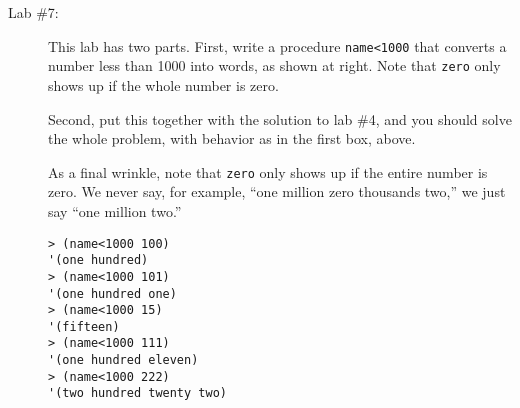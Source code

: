 \documentclass{article}
\begin{document}
\begin{description}
\item[Lab \#7:]  
\begin{multicols}{2} This lab has two parts.
First, write a procedure {\tt name<1000} that converts a
  number less than 1000 into words, as shown at right.
Note that {\tt zero} only shows up if the whole number is zero. 

Second, put this together with the solution to lab \#4, and you should
solve the whole problem, with behavior as in the first box, above.

As a final wrinkle, note that {\tt zero} only shows up if the entire
number is zero.  We never say, for example, ``one million zero
thousands two,'' we just say ``one million two.''  

\vfill

\columnbreak
\begin{Verbatim}[frame=single]
> (name<1000 100)
'(one hundred)
> (name<1000 101)
'(one hundred one)
> (name<1000 15)
'(fifteen)
> (name<1000 111)
'(one hundred eleven)
> (name<1000 222)
'(two hundred twenty two)
\end{Verbatim}
\end{multicols}
\end{description}
\end{document}
